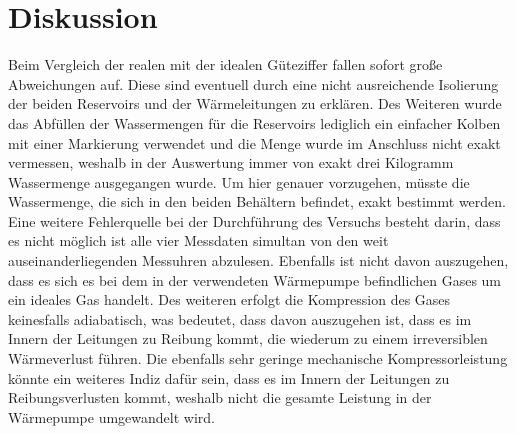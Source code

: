 \section{Diskussion}
Beim Vergleich der realen mit der idealen Güteziffer fallen sofort große Abweichungen auf. Diese sind eventuell
durch eine nicht ausreichende Isolierung der beiden Reservoirs und der Wärmeleitungen zu erklären.
Des Weiteren wurde das Abfüllen der Wassermengen für die Reservoirs lediglich ein einfacher
Kolben mit einer Markierung verwendet und die Menge wurde im Anschluss nicht exakt vermessen,
weshalb in der Auswertung immer von exakt drei Kilogramm Wassermenge ausgegangen wurde. Um hier
genauer vorzugehen, müsste die Wassermenge, die sich in den beiden Behältern befindet, exakt bestimmt werden.
Eine weitere Fehlerquelle bei der Durchführung des Versuchs besteht darin, dass es nicht möglich ist alle vier
Messdaten simultan von den weit auseinanderliegenden Messuhren abzulesen.
Ebenfalls ist nicht davon auszugehen, dass es sich es bei dem in der verwendeten Wärmepumpe befindlichen Gases um
ein ideales Gas handelt. Des weiteren erfolgt die Kompression des Gases keinesfalls adiabatisch, was bedeutet,
dass davon auszugehen ist, dass es im Innern der Leitungen zu Reibung kommt, die wiederum zu einem irreversiblen
Wärmeverlust führen. Die ebenfalls sehr geringe mechanische Kompressorleistung könnte ein weiteres Indiz dafür sein,
dass es im Innern der Leitungen zu Reibungsverlusten kommt, weshalb nicht die gesamte Leistung in der Wärmepumpe
umgewandelt wird.


\newpage
\nocite{*}
\printbibliography

